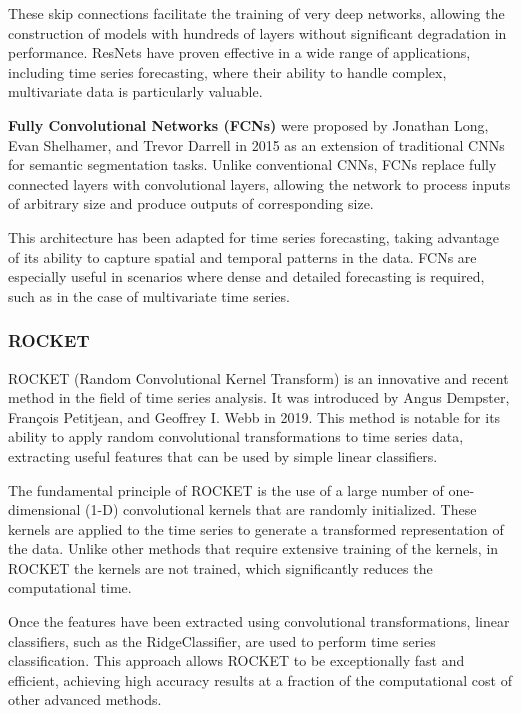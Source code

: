 These skip connections facilitate the training of very deep networks, allowing the construction of models with hundreds of layers without significant degradation in performance. ResNets have proven effective in a wide range of applications, including time series forecasting, where their ability to handle complex, multivariate data is particularly valuable.
\vspace{10pt}

\textbf{Fully Convolutional Networks (FCNs)}\cite{long2015fullyconvolutionalnetworkssemantic} were proposed by Jonathan Long, Evan Shelhamer, and Trevor Darrell in 2015 as an extension of traditional CNNs for semantic segmentation tasks. Unlike conventional CNNs, FCNs replace fully connected layers with convolutional layers, allowing the network to process inputs of arbitrary size and produce outputs of corresponding size.

This architecture has been adapted for time series forecasting, taking advantage of its ability to capture spatial and temporal patterns in the data. FCNs are especially useful in scenarios where dense and detailed forecasting is required, such as in the case of multivariate time series.
\vspace{10pt}

\subsubsection{ROCKET}
ROCKET (Random Convolutional Kernel Transform)\cite{Dempster_2020} is an innovative and recent method in the field of time series analysis. It was introduced by Angus Dempster, François Petitjean, and Geoffrey I. Webb in 2019. This method is notable for its ability to apply random convolutional transformations to time series data, extracting useful features that can be used by simple linear classifiers.

The fundamental principle of ROCKET is the use of a large number of one-dimensional (1-D) convolutional kernels that are randomly initialized. These kernels are applied to the time series to generate a transformed representation of the data. Unlike other methods that require extensive training of the kernels, in ROCKET the kernels are not trained, which significantly reduces the computational time.

Once the features have been extracted using convolutional transformations, linear classifiers, such as the RidgeClassifier, are used to perform time series classification. This approach allows ROCKET to be exceptionally fast and efficient, achieving high accuracy results at a fraction of the computational cost of other advanced methods.

